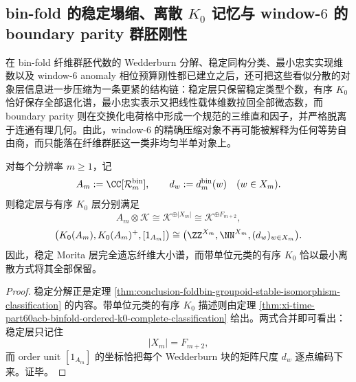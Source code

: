 \subsection{bin-fold 的稳定塌缩、离散 \texorpdfstring{$K_0$}{K0} 记忆与 window-\texorpdfstring{$6$}{6} 的 boundary parity 群胚刚性}\label{subsec:conclusion-foldbin-stable-k0-faithful-boundary-parity-groupoid}
在 bin-fold 纤维群胚代数的 Wedderburn 分解、稳定同构分类、最小忠实实现维数以及 window-\(6\) anomaly 相位预算刚性都已建立之后，还可把这些看似分散的对象层信息进一步压缩为一条更紧的结构链：稳定层只保留稳定类型个数，有序 \(K_0\) 恰好保存全部退化谱，最小忠实表示又把线性载体维数拉回全部微态数，而 boundary parity 则在交换化电荷格中形成一个规范的三维直和因子，并严格脱离于连通有理几何。由此，window-\(6\) 的精确压缩对象不再可能被解释为任何等势自由商，而只能落在纤维群胚这一类非均匀半单对象上。

\begin{theorem}[稳定塌缩后的最小离散记忆]\label{thm:conclusion-foldbin-stable-collapse-ordered-k0-memory}
对每个分辨率 \(m\ge 1\)，记
\[
A_m:=\CC[\mathcal R_m^{\mathrm{bin}}],
\qquad
d_w:=d_m^{\mathrm{bin}}(w)\quad (w\in X_m).
\]
则稳定层与有序 \(K_0\) 层分别满足
\[
A_m\otimes\mathcal K\cong \mathcal K^{\oplus |X_m|}\cong \mathcal K^{\oplus F_{m+2}},
\]
\[
\bigl(K_0(A_m),K_0(A_m)^+,[1_{A_m}]\bigr)
\cong
\bigl(\ZZ^{X_m},\NN^{X_m},(d_w)_{w\in X_m}\bigr).
\]
因此，稳定 Morita 层完全遗忘纤维大小谱，而带单位元类的有序 \(K_0\) 恰以最小离散方式将其全部保留。
\end{theorem}
\begin{proof}
稳定分解正是定理 \ref{thm:conclusion-foldbin-groupoid-stable-isomorphism-classification} 的内容。带单位元类的有序 \(K_0\) 描述则由定理 \ref{thm:xi-time-part60acb-binfold-ordered-k0-complete-classification} 给出。两式合并即可看出：稳定层只记住
\[
|X_m|=F_{m+2},
\]
而 order unit \([1_{A_m}]\) 的坐标恰把每个 Wedderburn 块的矩阵尺度 \(d_w\) 逐点编码下来。证毕。
\end{proof}

